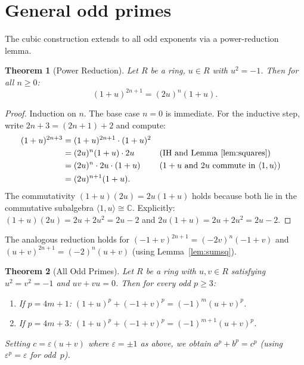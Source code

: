 \documentclass[11pt]{amsart}
\theoremstyle{plain}
\newtheorem{theorem}{Theorem}[section]
\theoremstyle{definition}
\theoremstyle{remark}
\newcommand{\C}{\mathbb{C}}
\begin{document}

\section{General odd primes}\label{sec:general}

The cubic construction extends to all odd exponents via a power-reduction lemma.

\begin{theorem}[Power Reduction]\label{thm:power-reduction}
Let $R$ be a ring, $u \in R$ with $u^2 = -1$. Then for all $n \geq 0$:
\[
  (1 + u)^{2n+1} = (2u)^n (1+u).
\]
\end{theorem}

\begin{proof}
Induction on $n$. The base case $n = 0$ is immediate.
For the inductive step, write $2n+3 = (2n+1) + 2$ and compute:
\begin{align*}
  (1+u)^{2n+3}
    &= (1+u)^{2n+1} \cdot (1+u)^2 \\
    &= (2u)^n(1+u) \cdot 2u && \text{(IH and Lemma~\ref{lem:squares})} \\
    &= (2u)^n \cdot 2u \cdot (1+u) && \text{($1+u$ and $2u$ commute in $\langle 1, u \rangle$)} \\
    &= (2u)^{n+1}(1+u).
\end{align*}
The commutativity $(1+u)(2u) = 2u(1+u)$ holds because both lie in
the commutative subalgebra $\langle 1, u \rangle \cong \C$.
Explicitly: $(1+u)(2u) = 2u + 2u^2 = 2u - 2$ and $2u(1+u) = 2u + 2u^2 = 2u - 2$.
\end{proof}

The analogous reduction holds for $(-1+v)^{2n+1} = (-2v)^n(-1+v)$
and $(u+v)^{2n+1} = (-2)^n(u+v)$ (using Lemma~\ref{lem:sumsq}).

\begin{theorem}[All Odd Primes]\label{thm:allodd}
Let $R$ be a ring with $u, v \in R$ satisfying $u^2 = v^2 = -1$ and $uv + vu = 0$.
Then for every odd $p \geq 3$:
\begin{enumerate}[label=(\roman*)]
  \item If $p = 4m + 1$: \;
    $(1+u)^p + (-1+v)^p = (-1)^m (u+v)^p$.
  \item If $p = 4m + 3$: \;
    $(1+u)^p + (-1+v)^p = (-1)^{m+1} (u+v)^p$.
\end{enumerate}
Setting $c = \varepsilon(u+v)$ where $\varepsilon = \pm 1$ as above,
we obtain $a^p + b^p = c^p$ (using $\varepsilon^p = \varepsilon$ for odd~$p$).
\end{theorem}
\end{document}

